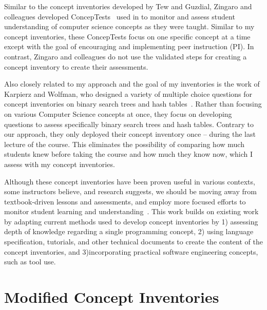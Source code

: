 Similar to the concept inventories developed by Tew and Guzdial, Zingaro and colleagues developed ConcepTests~\cite{zingaro2010experience} used in to monitor and assess student understanding of computer science concepts as they were taught. Similar to my concept inventories, these ConcepTests focus on one specific concept at a time except with the goal of encouraging and implementing peer instruction (PI). In contrast, Zingaro and colleagues do not use the validated steps for creating a concept inventory to create their assessments.
	
Also closely related to my approach and the goal of my inventories is the work of Karpierz and Wolfman, who designed a variety of multiple choice questions for concept inventories on binary search trees and hash tables~\cite{Karpierz2014Misconception}. Rather than focusing on various Computer Science concepts at once, they focus on developing questions to assess specifically binary search trees and hash tables. Contrary to our approach, they only deployed their concept inventory once -- during the last lecture of the course. This eliminates the possibility of comparing how much students knew before taking the course and how much they know now, which I assess with my concept inventories.
	
Although these concept inventories have been proven useful in various contexts, some instructors believe, and research suggests, we should be moving away from textbook-driven lessons and assessments, and employ more focused efforts to monitor student learning and understanding~\cite{pellegrino2001knowing, ghezzi2005challenges, wohlin1999achieving}. This work builds on existing work by adapting current methods used to develop concept inventories by 1) assessing depth of knowledge regarding a single programming concept, 2) using language specification, tutorials, and other technical documents to create the content of the concept inventories, and 3)incorporating practical software engineering concepts, such as tool use.

\section{Modified Concept Inventories}

